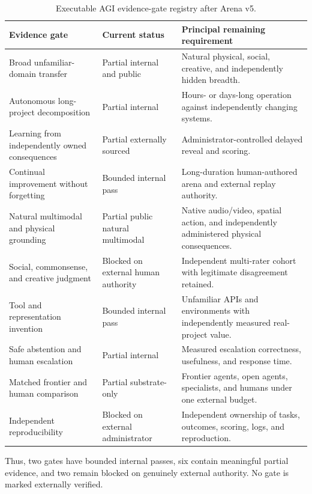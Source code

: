 \begin{table}[htbp]
\centering
\small
\caption{Executable AGI evidence-gate registry after Arena v5.}
\label{tab:agi-evidence-status}
\begin{tabular}{|>{\raggedright\arraybackslash}p{3.4cm}|>{\raggedright\arraybackslash}p{3.1cm}|>{\raggedright\arraybackslash}p{6.0cm}|}
\hline
\textbf{Evidence gate} & \textbf{Current status} & \textbf{Principal remaining requirement} \\
\hline
Broad unfamiliar-domain transfer & Partial internal and public & Natural physical, social, creative, and independently hidden breadth. \\
\hline
Autonomous long-project decomposition & Partial internal & Hours- or days-long operation against independently changing systems. \\
\hline
Learning from independently owned consequences & Partial externally sourced & Administrator-controlled delayed reveal and scoring. \\
\hline
Continual improvement without forgetting & Bounded internal pass & Long-duration human-authored arena and external replay authority. \\
\hline
Natural multimodal and physical grounding & Partial public natural multimodal & Native audio/video, spatial action, and independently administered physical consequences. \\
\hline
Social, commonsense, and creative judgment & Blocked on external human authority & Independent multi-rater cohort with legitimate disagreement retained. \\
\hline
Tool and representation invention & Bounded internal pass & Unfamiliar APIs and environments with independently measured real-project value. \\
\hline
Safe abstention and human escalation & Partial internal & Measured escalation correctness, usefulness, and response time. \\
\hline
Matched frontier and human comparison & Partial substrate-only & Frontier agents, open agents, specialists, and humans under one external budget. \\
\hline
Independent reproducibility & Blocked on external administrator & Independent ownership of tasks, outcomes, scoring, logs, and reproduction. \\
\hline
\end{tabular}
\end{table}

Thus, two gates have bounded internal passes, six contain meaningful partial
evidence, and two remain blocked on genuinely external authority.  No gate is
marked externally verified.


